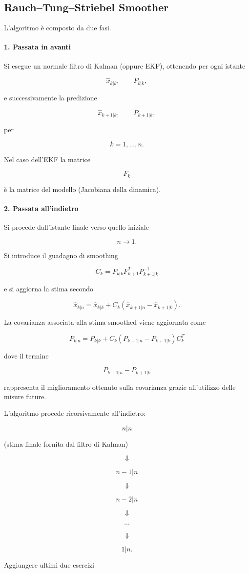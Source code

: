 \documentclass[11pt,a4paper]{article}
\begin{document}
\subsection{Rauch--Tung--Striebel Smoother}

L'algoritmo è composto da due fasi.

\paragraph{1. Passata in avanti}

Si esegue un normale filtro di Kalman (oppure EKF), ottenendo per ogni
istante

\[
\hat{x}_{k|k},
\qquad
P_{k|k},
\]

e successivamente la predizione

\[
\hat{x}_{k+1|k},
\qquad
P_{k+1|k},
\]

per

\[
k=1,\ldots,n.
\]

Nel caso dell'EKF la matrice

\[
F_k
\]

è la matrice del modello (Jacobiana della dinamica).

\bigskip

\paragraph{2. Passata all'indietro}

Si procede dall'istante finale verso quello iniziale

\[
n
\longrightarrow
1.
\]

Si introduce il guadagno di smoothing

\[
\boxed{
C_k
=
P_{k|k}
F_{k+1}^{T}
P_{k+1|k}^{-1}
}
\]

e si aggiorna la stima secondo

\[
\boxed{
\hat{x}_{k|n}
=
\hat{x}_{k|k}
+
C_k
\left(
\hat{x}_{k+1|n}
-
\hat{x}_{k+1|k}
\right).
}
\]

La covarianza associata alla stima smoothed viene aggiornata come

\[
\boxed{
P_{k|n}
=
P_{k|k}
+
C_k
\left(
P_{k+1|n}
-
P_{k+1|k}
\right)
C_k^{T}
}
\]

dove il termine

\[
P_{k+1|n}-P_{k+1|k}
\]

rappresenta il miglioramento ottenuto sulla covarianza grazie
all'utilizzo delle misure future.

\vspace{1em}

L'algoritmo procede ricorsivamente all'indietro:

\[
n|n
\]

(stima finale fornita dal filtro di Kalman)

\[
\Downarrow
\]

\[
n-1|n
\]

\[
\Downarrow
\]

\[
n-2|n
\]

\[
\Downarrow
\]

\[
\cdots
\]

\[
\Downarrow
\]

\[
1|n.
\]

Aggiungere ultimi due esercizi
\end{document}
